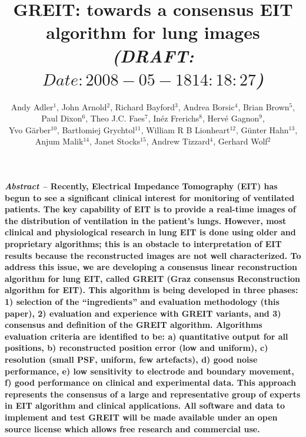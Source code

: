 \documentclass[letterpaper,twocolumn,10pt]{article}
\begin{document}
\title{\bf GREIT: towards a consensus EIT algorithm for lung images
\normalsize \em (DRAFT: $Date: 2008-05-18 14:18:27 $)%
}

\author{Andy Adler$^{1}$,
        John Arnold$^{2}$,
        Richard Bayford$^{3}$,
        Andrea Borsic$^{4}$,
        Brian Brown$^{5}$,
\\
        Paul Dixon$^{6}$,
        Theo J.C. Faes$^{7}$,
        In\'ez Frerichs$^{8}$,
        Herv\'e Gagnon$^{9}$,
\\
        Yvo G\"arber$^{10}$,
        Bart\l{}omiej Grychtol$^{11}$, 
        William R B Lionheart$^{12}$,
        G\"unter Hahn$^{13}$,
\\
        Anjum Malik$^{14}$,
        Janet Stocks$^{15}$,
        Andrew Tizzard$^{4}$,
        Gerhard Wolf$^{2}$
       }

\date{}
\maketitle

\renewcommand{\baselinestretch}{0.9} \normalfont

{\small \bf
 {\em Abstract --}
Recently, Electrical Impedance Tomography (EIT) has begun to see a
significant clinical interest for monitoring of
ventilated patients.  The key capability of EIT is to
provide a real-time images of the distribution of ventilation in
the patient's lungs.
However, most clinical and physiological research in lung EIT
is done using older and proprietary algorithms; this is
an obstacle to interpretation of EIT results because the
reconstructed images are not well characterized.
To address this issue, we are developing a
consensus linear reconstruction algorithm for lung EIT,
called GREIT (Graz consensus Reconstruction algorithm for EIT).
This algorithm is being developed in three phases:
1) selection of the ``ingredients'' and evaluation 
methodology (this paper),
2) evaluation and experience with GREIT variants, and
3) consensus and definition of the GREIT algorithm.
Algorithms evaluation criteria are identified to be:
a) quantitative output for all positions,
b) reconstructed position error (low and uniform),
c) resolution (small PSF, uniform, few artefacts),
d) good noise performance,
e) low sensitivity to electrode and boundary movement,
f) good performance on clinical and experimental data.
This approach represents the consensus of a large and representative
group of experts in EIT algorithm and clinical applications.
All software and data to implement and test GREIT will be
made available under an open source license which allows free
research and commercial use.
}
\end{document}
